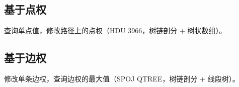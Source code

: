 \subsection{基于点权}

查询单点值，修改路径上的点权（HDU 3966，树链剖分 + 树状数组）。



\subsection{基于边权}

修改单条边权，查询边权的最大值（SPOJ QTREE，树链剖分 + 线段树）。


